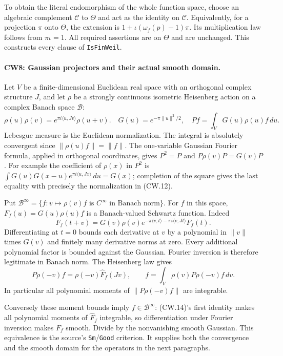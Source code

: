 To obtain the literal endomorphism of the whole function space,
choose an algebraic complement $\mathcal C$ to $\Theta$ and act as
the identity on $\mathcal C$.  Equivalently, for a projection
$\pi$ onto $\Theta$, the extension is
$1+\iota(\omega_f(p)-1)\pi$.  Its multiplication law follows from
$\pi\iota=1$.  All required assertions are on $\Theta$ and are
unchanged.  This constructs every clause of \texttt{IsFinWeil}.

\paragraph{CW8: Gaussian projectors and their actual smooth domain.}
Let $V$ be a finite-dimensional Euclidean real space with an
orthogonal complex structure $J$, and let $\rho$ be a strongly
continuous isometric Heisenberg action on a complex Banach space
$\mathcal B$:
\[
 \rho(u)\rho(v)=e^{\pi i\langle u,Jv\rangle}\rho(u+v).
 \quad G(u)=e^{-\pi\|u\|^2/2},\quad
 P f=\int_VG(u)\rho(u)f\,du .                           \tag{CW.12}
\]
Lebesgue measure is the Euclidean normalization.  The integral is
absolutely convergent since $\|\rho(u)f\|=\|f\|$.
The one-variable Gaussian Fourier formula, applied in orthogonal
coordinates, gives $P^2=P$ and
$P\rho(v)P=G(v)P$.  For example the coefficient of $\rho(x)$
in $P^2$ is
$\int G(u)G(x-u)e^{\pi i\langle u,Jx\rangle}\,du=G(x)$;
completion of the square gives the last equality with precisely
the normalization in (CW.12).

Put $\mathcal B^\infty=\{f:v\mapsto\rho(v)f\text{ is }C^\infty
\text{ in Banach norm}\}$.  For $f$ in this space,
$F_f(u)=G(u)\rho(u)f$ is a Banach-valued Schwartz function.
Indeed
\[
 F_f(t+v)=G(v)\rho(v)
     e^{-\pi\langle v,t\rangle-\pi i\langle v,Jt\rangle}F_f(t).
                                                               \tag{CW.13}
\]
Differentiating at $t=0$ bounds each derivative at $v$ by a
polynomial in $\|v\|$ times $G(v)$ and finitely many derivative
norms at zero.  Every additional polynomial factor is bounded
against the Gaussian.  Fourier inversion is therefore legitimate
in Banach norm.  The Heisenberg law gives
\[
 P\rho(-v)f=\rho(-v)\widehat F_f(Jv),\qquad
       f=\int_V\rho(v)P\rho(-v)f\,dv .                 \tag{CW.14}
\]
In particular all polynomial moments of
$\|P\rho(-v)f\|$ are integrable.

Conversely these moment bounds imply $f\in\mathcal B^\infty$:
(CW.14)'s first identity makes all polynomial moments of
$\widehat F_f$ integrable, so differentiation under Fourier
inversion makes $F_f$ smooth.  Divide by the nonvanishing smooth
Gaussian.  This equivalence is the source's \texttt{Sm}/\texttt{Good}
criterion.  It supplies both the convergence and the smooth domain
for the operators in the next paragraphs.

